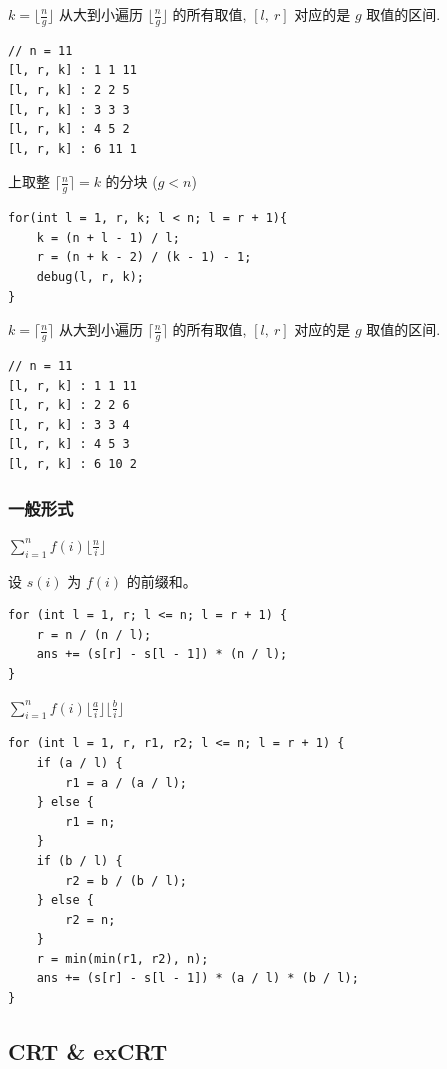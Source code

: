 \documentclass[UTF8, a4paper, titlepage, twoside]{ctexart}
\begin{document}
$k = \lfloor \frac{n}{g} \rfloor$ 从大到小遍历 $\lfloor \frac{n}{g} \rfloor$ 的所有取值, $[l, \ r]$ 对应的是 $g$ 取值的区间.

\begin{lstlisting}[style=cpp]
// n = 11
[l, r, k] : 1 1 11 
[l, r, k] : 2 2 5 
[l, r, k] : 3 3 3 
[l, r, k] : 4 5 2 
[l, r, k] : 6 11 1 
\end{lstlisting}

上取整 $\lceil \frac{n}{g} \rceil = k$ 的分块 ($g < n$)

\begin{lstlisting}[style=cpp]
for(int l = 1, r, k; l < n; l = r + 1){
    k = (n + l - 1) / l;
    r = (n + k - 2) / (k - 1) - 1;
    debug(l, r, k);
}
\end{lstlisting}

$k = \lceil \frac{n}{g} \rceil$ 从大到小遍历 $\lceil \frac{n}{g} \rceil$ 的所有取值, $[l, \ r]$ 对应的是 $g$ 取值的区间.

\begin{lstlisting}[style=cpp]
// n = 11
[l, r, k] : 1 1 11 
[l, r, k] : 2 2 6 
[l, r, k] : 3 3 4 
[l, r, k] : 4 5 3 
[l, r, k] : 6 10 2 
\end{lstlisting}

\subsubsection*{ 一般形式 }

$\sum_{i=1}^n f(i)\lfloor \frac{n}{i} \rfloor$

设 $s(i)$ 为 $f(i)$ 的前缀和。

\begin{lstlisting}[style=cpp]
for (int l = 1, r; l <= n; l = r + 1) {
    r = n / (n / l);
    ans += (s[r] - s[l - 1]) * (n / l);
}
\end{lstlisting}

$\sum_{i = 1}^{n}f(i){\lfloor{\frac{a}{i}}\rfloor\lfloor{\frac{b}{i}}\rfloor}$

\begin{lstlisting}[style=cpp]
for (int l = 1, r, r1, r2; l <= n; l = r + 1) {
    if (a / l) {
        r1 = a / (a / l);
    } else {
        r1 = n;
    }
    if (b / l) {
        r2 = b / (b / l);
    } else {
        r2 = n;
    }
    r = min(min(r1, r2), n);
    ans += (s[r] - s[l - 1]) * (a / l) * (b / l);
}
\end{lstlisting}

\subsection{ CRT \& exCRT }
\end{document}
